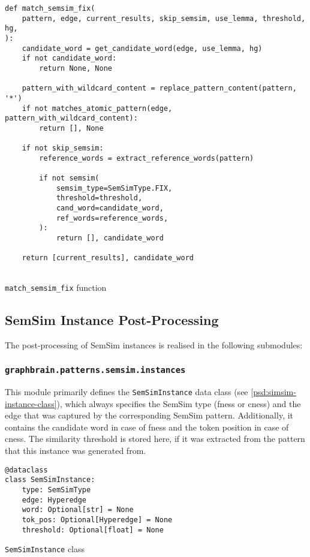 \documentclass[11pt]{scrreprt}
\begin{document}
\begin{pseudo}
\begin{lstlisting}
def match_semsim_fix(
    pattern, edge, current_results, skip_semsim, use_lemma, threshold, hg,
):
    candidate_word = get_candidate_word(edge, use_lemma, hg)
    if not candidate_word:
        return None, None

    pattern_with_wildcard_content = replace_pattern_content(pattern, '*')
    if not matches_atomic_pattern(edge, pattern_with_wildcard_content):
        return [], None

    if not skip_semsim:
        reference_words = extract_reference_words(pattern)

        if not semsim(
            semsim_type=SemSimType.FIX,
            threshold=threshold,
            cand_word=candidate_word,
            ref_words=reference_words,
        ):
            return [], candidate_word

    return [current_results], candidate_word
 
\end{lstlisting}
\label{psd:match-semsim-fix-function}
\caption{\texttt{match\_semsim\_fix} function}
\end{pseudo}

\subsection{SemSim Instance Post-Processing}
The post-processing of SemSim instances is realised in the following submodules:

\subsubsection{\texttt{graphbrain.patterns.semsim.instances}}

This module primarily defines the \texttt{SemSimInstance} data class (see \cref{psd:simsim-instance-class}), which always specifies the SemSim type (\gls{fness} or \gls{cness}) and the edge that was captured by the corresponding SemSim pattern. Additionally, it contains the candidate word in case of \gls{fness} and the token position in case of \gls{cness}. The similarity threshold is stored here, if it was extracted from the pattern that this instance was generated from.

\begin{pseudo}
\begin{lstlisting}
@dataclass
class SemSimInstance:
    type: SemSimType
    edge: Hyperedge
    word: Optional[str] = None
    tok_pos: Optional[Hyperedge] = None
    threshold: Optional[float] = None
\end{lstlisting}
\label{psd:simsim-instance-class}
\caption{\texttt{SemSimInstance} class}
\end{pseudo}
\end{document}

